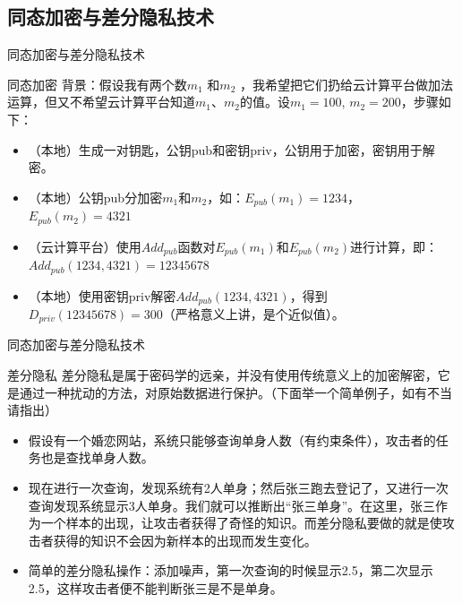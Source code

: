 \documentclass{beamer}
\begin{document}
\subsection{同态加密与差分隐私技术}
\begin{frame}{同态加密与差分隐私技术}
\begin{exampleblock}{同态加密}
	背景：假设我有两个数$m_{1}$ 和$m_{2}$ ，我希望把它们扔给云计算平台做加法运算，但又不希望云计算平台知道$m_{1}$、$m_{2}$的值。设$m_1=100$, $m_2=200$，步骤如下：\\
	\begin{itemize}
		\item {\footnotesize（本地）生成一对钥匙，公钥pub和密钥priv，公钥用于加密，密钥用于解密。}
		\item {\footnotesize（本地）公钥pub分加密$m_{1}$和$m_{2}$，如：$E_{pub}(m_1)=1234$，$E_{pub}(m_2)=4321$}
		\item {\footnotesize （云计算平台）使用$Add_{pub}$函数对$E_{pub}(m_1)$和$E_{pub}(m_2)$进行计算，即：$Add_{pub}(1234, 4321)=12345678$}
		\item {\footnotesize （本地）使用密钥priv解密$Add_{pub}(1234, 4321)$，得到$D_{priv}(12345678) = 300$（严格意义上讲，是个近似值）。}
	\end{itemize}
\end{exampleblock}
\end{frame}
\begin{frame}{同态加密与差分隐私技术}
\begin{exampleblock}{差分隐私}
差分隐私是属于密码学的远亲，并没有使用传统意义上的加密解密，它是通过一种扰动的方法，对原始数据进行保护。（下面举一个简单例子，如有不当请指出）\\
\begin{itemize}
		\item {\footnotesize 假设有一个婚恋网站，系统只能够查询单身人数（有约束条件），攻击者的任务也是查找单身人数。}
		\item {\footnotesize 现在进行一次查询，发现系统有2人单身；然后张三跑去登记了，又进行一次查询发现系统显示3人单身。我们就可以推断出“张三单身”。在这里，张三作为一个样本的出现，让攻击者获得了奇怪的知识。{\color {red}而差分隐私要做的就是使攻击者获得的知识不会因为新样本的出现而发生变化。}}
		\item {\footnotesize 简单的差分隐私操作：添加噪声，第一次查询的时候显示2.5，第二次显示2.5，这样攻击者便不能判断张三是不是单身。}
	\end{itemize}

\end{exampleblock}
\end{frame}
\end{document}
